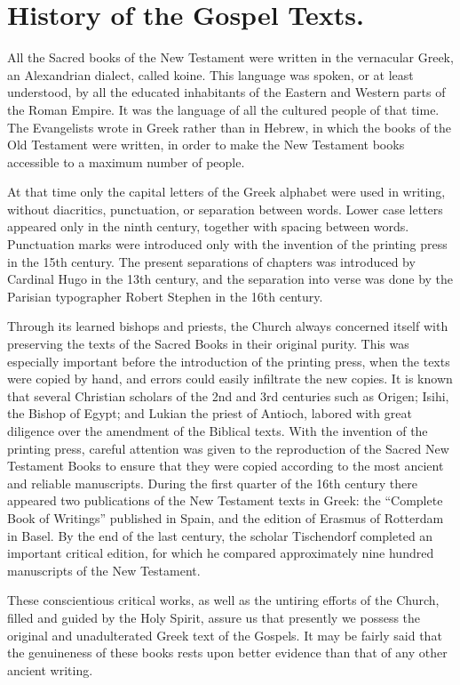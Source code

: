 \section{History of the Gospel Texts.}

All the Sacred books of the New Testament were written in the vernacular Greek, an Alexandrian dialect, called koine. This language was spoken, or at least understood, by all the educated inhabitants of the Eastern and Western parts of the Roman Empire. It was the language of all the cultured people of that time. The Evangelists wrote in Greek rather than in Hebrew, in which the books of the Old Testament were written, in order to make the New Testament books accessible to a maximum number of people.

At that time only the capital letters of the Greek alphabet were used in writing, without diacritics, punctuation, or separation between words. Lower case letters appeared only in the ninth century, together with spacing between words. Punctuation marks were introduced only with the invention of the printing press in the 15th century. The present separations of chapters was introduced by Cardinal Hugo in the 13th century, and the separation into verse was done by the Parisian typographer Robert Stephen in the 16th century.

Through its learned bishops and priests, the Church always concerned itself with preserving the texts of the Sacred Books in their original purity. This was especially important before the introduction of the printing press, when the texts were copied by hand, and errors could easily infiltrate the new copies. It is known that several Christian scholars of the 2nd and 3rd centuries such as Origen; Isihi, the Bishop of Egypt; and Lukian the priest of Antioch, labored with great diligence over the amendment of the Biblical texts. With the invention of the printing press, careful attention was given to the reproduction of the Sacred New Testament Books to ensure that they were copied according to the most ancient and reliable manuscripts. During the first quarter of the 16th century there appeared two publications of the New Testament texts in Greek: the ``Complete Book of Writings'' published in Spain, and the edition of Erasmus of Rotterdam in Basel. By the end of the last century, the scholar Tischendorf completed an important critical edition, for which he compared approximately nine hundred manuscripts of the New Testament.

These conscientious critical works, as well as the untiring efforts of the Church, filled and guided by the Holy Spirit, assure us that presently we possess the original and unadulterated Greek text of the Gospels. It may be fairly said that the genuineness of these books rests upon better evidence than that of any other ancient writing.

